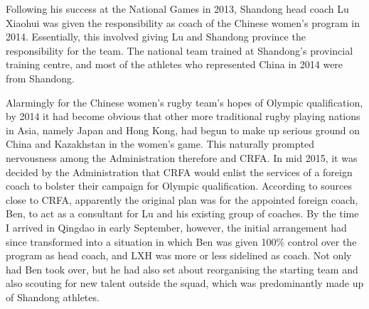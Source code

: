 \begin{CJK}{UTF8}{gbsn}
Following his success at the National Games in 2013, Shandong head coach Lu Xiaohui was given the responsibility as coach of the Chinese women's program in 2014.  Essentially, this involved giving Lu and  Shandong province the responsibility for the team.  The national team trained at Shandong's provincial training centre, and most of the athletes who represented China in 2014 were from Shandong.

Alarmingly for the Chinese women's rugby team's hopes of Olympic qualification, by 2014 it had become obvious that other more traditional rugby playing nations in Asia, namely Japan and Hong Kong, had begun to make up serious ground on China and Kazakhstan in the women's game.  This naturally prompted nervousness among the Administration therefore and CRFA.  In mid 2015, it was decided by the Administration that CRFA would enlist the services of a foreign coach to bolster their campaign for Olympic qualification.  According to sources close to CRFA, apparently the original plan was for the appointed foreign coach, Ben, to act as a consultant for Lu and his existing group of coaches.  By the time I arrived in Qingdao in early September, however, the initial arrangement had since transformed into a situation in which Ben was given 100\% control over the program as head coach, and LXH was more or less sidelined as coach. Not only had Ben took over, but he had also set about reorganising the starting team and also scouting for new talent outside the squad, which was predominantly made up of Shandong athletes.



\end{CJK}
